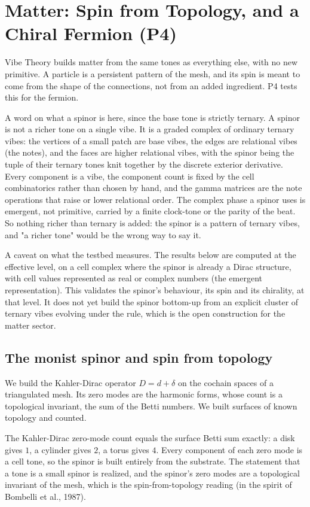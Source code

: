 \section{Matter: Spin from Topology, and a Chiral Fermion (P4)}
\label{sec:matter}

Vibe Theory builds matter from the same tones as everything else, with no new primitive. A particle is a persistent pattern of the mesh, and its spin is meant to come from the shape of the connections, not from an added ingredient. P4 tests this for the fermion.

A word on what a spinor is here, since the base tone is strictly ternary. A spinor is not a richer tone on a single vibe. It is a graded complex of ordinary ternary vibes: the vertices of a small patch are base vibes, the edges are relational vibes (the notes), and the faces are higher relational vibes, with the spinor being the tuple of their ternary tones knit together by the discrete exterior derivative. Every component is a vibe, the component count is fixed by the cell combinatorics rather than chosen by hand, and the gamma matrices are the note operations that raise or lower relational order. The complex phase a spinor uses is emergent, not primitive, carried by a finite clock-tone or the parity of the beat. So nothing richer than ternary is added: the spinor is a pattern of ternary vibes, and "a richer tone" would be the wrong way to say it.

A caveat on what the testbed measures. The results below are computed at the effective level, on a cell complex where the spinor is already a Dirac structure, with cell values represented as real or complex numbers (the emergent representation). This validates the spinor's behaviour, its spin and its chirality, at that level. It does not yet build the spinor bottom-up from an explicit cluster of ternary vibes evolving under the rule, which is the open construction for the matter sector.

\subsection{The monist spinor and spin from topology}

We build the Kahler-Dirac operator $D = d + \delta$ on the cochain spaces of a triangulated mesh. Its zero modes are the harmonic forms, whose count is a topological invariant, the sum of the Betti numbers. We built surfaces of known topology and counted.

\begin{result}
The Kahler-Dirac zero-mode count equals the surface Betti sum exactly: a disk gives $1$, a cylinder gives $2$, a torus gives $4$. Every component of each zero mode is a cell tone, so the spinor is built entirely from the substrate. The statement that a tone is a small spinor is realized, and the spinor's zero modes are a topological invariant of the mesh, which is the spin-from-topology reading (in the spirit of Bombelli et al., 1987).
\end{result}

